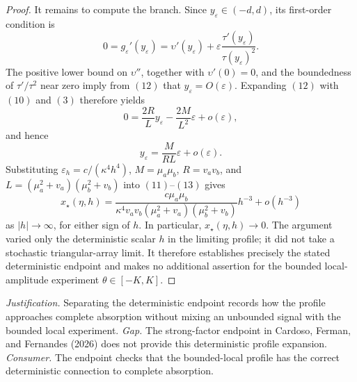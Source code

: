 \documentclass{article}
\begin{document}
\begin{proof}
It remains to compute the branch.  Since \(y_{\varepsilon}\in(-d,d)\), its first-order condition is
\[
 0=g_\varepsilon'(y_\varepsilon)
 =\upsilon'(y_\varepsilon)
  +\varepsilon\frac{\tau'(y_\varepsilon)}{\tau(y_\varepsilon)^2}. \tag{12}
\]
The positive lower bound on \(\upsilon''\), together with \(\upsilon'(0)=0\), and the boundedness of \(\tau'/\tau^2\) near zero imply from \((12)\) that \(y_\varepsilon=O(\varepsilon)\).  Expanding \((12)\) with \((10)\) and \((3)\) therefore yields
\[
 0=\frac{2R}{L}y_\varepsilon
   -\frac{2M}{L^2}\varepsilon+o(\varepsilon),
\]
and hence
\[
 y_\varepsilon=\frac{M}{RL}\varepsilon+o(\varepsilon).            \tag{13}
\]
Substituting \(\varepsilon_h=c/(\kappa^4h^4)\), \(M=\mu_a\mu_b\), \(R=v_av_b\), and \(L=(\mu_a^2+v_a)(\mu_b^2+v_b)\) into \((11)\)--\((13)\) gives
\[
 x_\star(\eta,h)
 =\frac{c\mu_a\mu_b}
 {\kappa^4v_av_b(\mu_a^2+v_a)(\mu_b^2+v_b)}h^{-3}
 +o(h^{-3})
\]
as \(|h|\to\infty\), for either sign of \(h\).  In particular, \(x_\star(\eta,h)\to0\).  The argument varied only the deterministic scalar \(h\) in the limiting profile; it did not take a stochastic triangular-array limit.  It therefore establishes precisely the stated deterministic endpoint and makes no additional assertion for the bounded local-amplitude experiment \(\theta\in[-K,K]\).
\end{proof}
\par\smallskip\noindent \textit{Justification.} Separating the deterministic endpoint records how the profile approaches complete absorption without mixing an unbounded signal with the bounded local experiment. \textit{Gap.} The strong-factor endpoint in Cardoso, Ferman, and Fernandes (2026) does not provide this deterministic profile expansion. \textit{Consumer.} The endpoint checks that the bounded-local profile has the correct deterministic connection to complete absorption.
\end{document}
